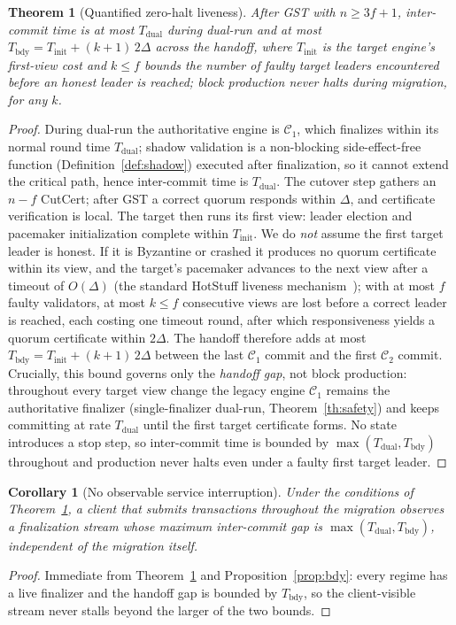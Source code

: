 \documentclass[journal]{IEEEtran}
\newtheorem{theorem}{Theorem}
\newtheorem{corollary}{Corollary}
\theoremstyle{remark}
\begin{document}
\begin{theorem}[Quantified zero-halt liveness]
\label{th:liveness}
After GST with $n\ge 3f+1$, inter-commit time is at most $T_{\mathrm{dual}}$ during dual-run
and at most $T_{\mathrm{bdy}} = T_{\mathrm{init}} + (k{+}1)\,2\Delta$ across the handoff, where
$T_{\mathrm{init}}$ is the target engine's first-view cost and $k\le f$ bounds the number of
faulty target leaders encountered before an honest leader is reached; block production never
halts during migration, for any $k$.
\end{theorem}
\begin{proof}
During dual-run the authoritative engine is $\mathcal{C}_1$, which finalizes within its normal
round time $T_{\mathrm{dual}}$; shadow validation is a non-blocking side-effect-free function
(Definition~\ref{def:shadow}) executed after finalization, so it cannot extend the critical
path, hence inter-commit time is $T_{\mathrm{dual}}$. The cutover step gathers an $n-f$ CutCert;
after GST a correct quorum responds within $\Delta$, and certificate verification is local. The
target then runs its first view: leader election and pacemaker initialization complete within
$T_{\mathrm{init}}$. We do \emph{not} assume the first target leader is honest. If it is Byzantine
or crashed it produces no quorum certificate within its view, and the target's pacemaker advances
to the next view after a timeout of $O(\Delta)$ (the standard HotStuff liveness
mechanism~\cite{hotstuff}); with at most $f$ faulty validators, at most $k\le f$ consecutive views
are lost before a correct leader is reached, each costing one timeout round, after which
responsiveness yields a quorum certificate within $2\Delta$. The handoff therefore adds at most
$T_{\mathrm{bdy}}=T_{\mathrm{init}}+(k{+}1)\,2\Delta$ between the last $\mathcal{C}_1$ commit and
the first $\mathcal{C}_2$ commit. Crucially, this bound governs only the \emph{handoff gap}, not
block production: throughout every target view change the legacy engine $\mathcal{C}_1$ remains the
authoritative finalizer (single-finalizer dual-run, Theorem~\ref{th:safety}) and keeps committing
at rate $T_{\mathrm{dual}}$ until the first target certificate forms. No state introduces a stop
step, so inter-commit time is bounded by $\max(T_{\mathrm{dual}}, T_{\mathrm{bdy}})$ throughout and
production never halts even under a faulty first target leader.
\end{proof}

\begin{corollary}[No observable service interruption]
\label{cor:nohalt}
Under the conditions of Theorem~\ref{th:liveness}, a client that submits transactions throughout
the migration observes a finalization stream whose maximum inter-commit gap is
$\max(T_{\mathrm{dual}}, T_{\mathrm{bdy}})$, independent of the migration itself.
\end{corollary}
\begin{proof}
Immediate from Theorem~\ref{th:liveness} and Proposition~\ref{prop:bdy}: every regime has a live
finalizer and the handoff gap is bounded by $T_{\mathrm{bdy}}$, so the client-visible stream
never stalls beyond the larger of the two bounds.
\end{proof}
\end{document}
